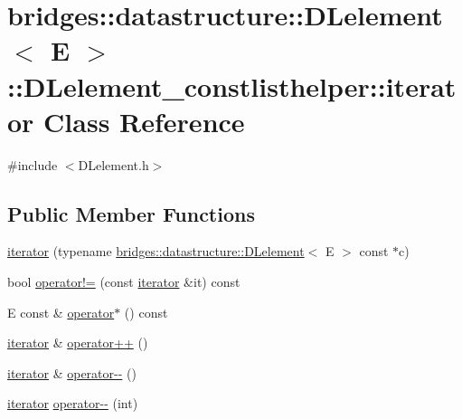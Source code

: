 \hypertarget{classbridges_1_1datastructure_1_1_d_lelement_1_1_d_lelement__constlisthelper_1_1iterator}{}\section{bridges\+:\+:datastructure\+:\+:D\+Lelement$<$ E $>$\+:\+:D\+Lelement\+\_\+constlisthelper\+:\+:iterator Class Reference}
\label{classbridges_1_1datastructure_1_1_d_lelement_1_1_d_lelement__constlisthelper_1_1iterator}


{\ttfamily \#include $<$D\+Lelement.\+h$>$}

\subsection*{Public Member Functions}
\begin{DoxyCompactItemize}
\item 
\hyperlink{classbridges_1_1datastructure_1_1_d_lelement_1_1_d_lelement__constlisthelper_1_1iterator_a17abad4b535a7f750ad51caf734899ab}{iterator} (typename \hyperlink{classbridges_1_1datastructure_1_1_d_lelement}{bridges\+::datastructure\+::\+D\+Lelement}$<$ E $>$ const $\ast$c)
\item 
bool \hyperlink{classbridges_1_1datastructure_1_1_d_lelement_1_1_d_lelement__constlisthelper_1_1iterator_a9a54e2e9ed8f8560bd549315c7c58671}{operator!=} (const \hyperlink{classbridges_1_1datastructure_1_1_d_lelement_1_1_d_lelement__constlisthelper_1_1iterator}{iterator} \&it) const
\item 
E const  \& \hyperlink{classbridges_1_1datastructure_1_1_d_lelement_1_1_d_lelement__constlisthelper_1_1iterator_a0307b7d206e312f6a753f821141b0f93}{operator$\ast$} () const
\item 
\hyperlink{classbridges_1_1datastructure_1_1_d_lelement_1_1_d_lelement__constlisthelper_1_1iterator}{iterator} \& \hyperlink{classbridges_1_1datastructure_1_1_d_lelement_1_1_d_lelement__constlisthelper_1_1iterator_a3ee8a1a224a1de1b32ddfcc20f193d93}{operator++} ()
\item 
\hyperlink{classbridges_1_1datastructure_1_1_d_lelement_1_1_d_lelement__constlisthelper_1_1iterator}{iterator} \& \hyperlink{classbridges_1_1datastructure_1_1_d_lelement_1_1_d_lelement__constlisthelper_1_1iterator_a552a24868dea8eee66ea7a8bc7e745ea}{operator-\/-\/} ()
\item 
\hyperlink{classbridges_1_1datastructure_1_1_d_lelement_1_1_d_lelement__constlisthelper_1_1iterator}{iterator} \hyperlink{classbridges_1_1datastructure_1_1_d_lelement_1_1_d_lelement__constlisthelper_1_1iterator_ae2aa32f5c4e40c62d3bf37de7bb6342f}{operator-\/-\/} (int)
\end{DoxyCompactItemize}


